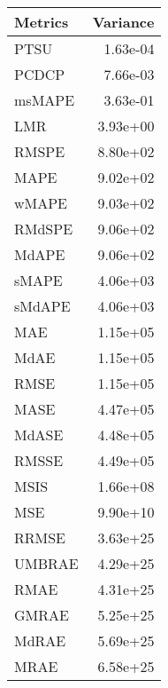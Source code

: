 \begin{tabular}{lr}
\toprule
Metrics & Variance \\
\midrule
PTSU & 1.63e-04 \\
PCDCP & 7.66e-03 \\
msMAPE & 3.63e-01 \\
LMR & 3.93e+00 \\
RMSPE & 8.80e+02 \\
MAPE & 9.02e+02 \\
wMAPE & 9.03e+02 \\
RMdSPE & 9.06e+02 \\
MdAPE & 9.06e+02 \\
sMAPE & 4.06e+03 \\
sMdAPE & 4.06e+03 \\
MAE & 1.15e+05 \\
MdAE & 1.15e+05 \\
RMSE & 1.15e+05 \\
MASE & 4.47e+05 \\
MdASE & 4.48e+05 \\
RMSSE & 4.49e+05 \\
MSIS & 1.66e+08 \\
MSE & 9.90e+10 \\
RRMSE & 3.63e+25 \\
UMBRAE & 4.29e+25 \\
RMAE & 4.31e+25 \\
GMRAE & 5.25e+25 \\
MdRAE & 5.69e+25 \\
MRAE & 6.58e+25 \\
\bottomrule
\end{tabular}
